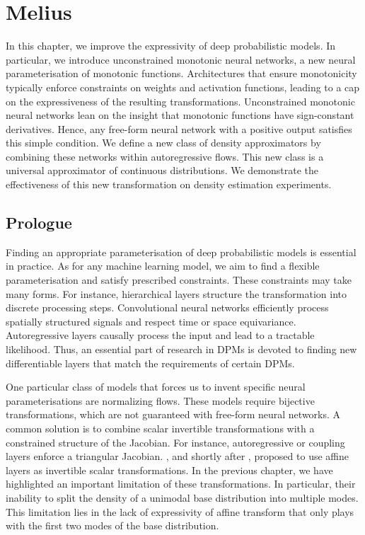 \chapter{Melius}\label{ch:05}

\begin{chapter_outline}

  In this chapter, we improve the expressivity of deep probabilistic models.
  In particular, we introduce unconstrained monotonic neural networks, a new neural parameterisation of monotonic functions.
  Architectures that ensure monotonicity typically enforce constraints on weights and activation functions, leading to a cap on the expressiveness of the resulting transformations.
  Unconstrained monotonic neural networks lean on the insight that monotonic functions have sign-constant derivatives. Hence, any free-form neural network with a positive output satisfies this simple condition.
  We define a new class of density approximators by combining these networks within autoregressive flows. This new class is a universal approximator of continuous distributions.
  We demonstrate the effectiveness of this new transformation on density estimation experiments.
\end{chapter_outline}

\section{Prologue}
Finding an appropriate parameterisation of deep probabilistic models is essential in practice. As for any machine learning model, we aim to find a flexible parameterisation and satisfy prescribed constraints. These constraints may take many forms. For instance, hierarchical layers structure the transformation into discrete processing steps. Convolutional neural networks efficiently process spatially structured signals and respect time or space equivariance. Autoregressive layers causally process the input and lead to a tractable likelihood. Thus, an essential part of research in DPMs is devoted to finding new differentiable layers that match the requirements of certain DPMs.

One particular class of models that forces us to invent specific neural parameterisations are normalizing flows. These models require bijective transformations, which are not guaranteed with free-form neural networks. A common solution is to combine scalar invertible transformations with a constrained structure of the Jacobian. For instance, autoregressive or coupling layers enforce a triangular Jacobian. \citet{rezende2015variational}, and shortly after \citet{kingma_improved_2016, dinh_density_2017}, proposed to use affine layers as invertible scalar transformations. In the previous chapter, we have highlighted an important limitation of these transformations. In particular, their inability to split the density of a unimodal base distribution into multiple modes. This limitation lies in the lack of expressivity of affine transform that only plays with the first two modes of the base distribution.

